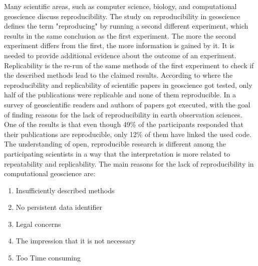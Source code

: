 \documentclass[draft,final]{vutinfth} %
\begin{document}
Many scientific areas, such as computer science, biology, and computational geoscience discuss reproducibility. The study on reproducibility in geoscience \cite{reprovsrepli} defines the term "reproducing" by running a second different experiment, which results in the same conclusion as the first experiment. The more the second experiment differs from the first, the more information is gained by it. It is needed to provide additional evidence about the outcome of an experiment. Replicability is the re-run of the same methods of the first experiment to check if the described methods lead to the claimed results\cite{reprovsrepli}. According to \cite{Ostermann2017AdvancingSW} where the reproducibility and replicability of scientific papers in geoscience got tested, only half of the publications were replicable and none of them reproducible. In \cite{Thestateofreproducibility} a survey of geoscientific readers and authors of papers got executed, with the goal of finding reasons for the lack of reproducibility in earth observation sciences. One of the results is that even though 49\% of the participants responded that their publications are reproducible, only 12\% of them have linked the used code. The understanding of open, reproducible research is different among the participating scientists in a way that the interpretation is more related to repeatability and replicability. The main reasons for the lack of reproducibility in computational geoscience are:

\begin{enumerate}
	\item Insufficiently described methods 
	\item No persistent data identifier
	\item Legal concerns
	\item The impression that it is not necessary
	\item Too Time consuming
\end{enumerate} 
\end{document}
